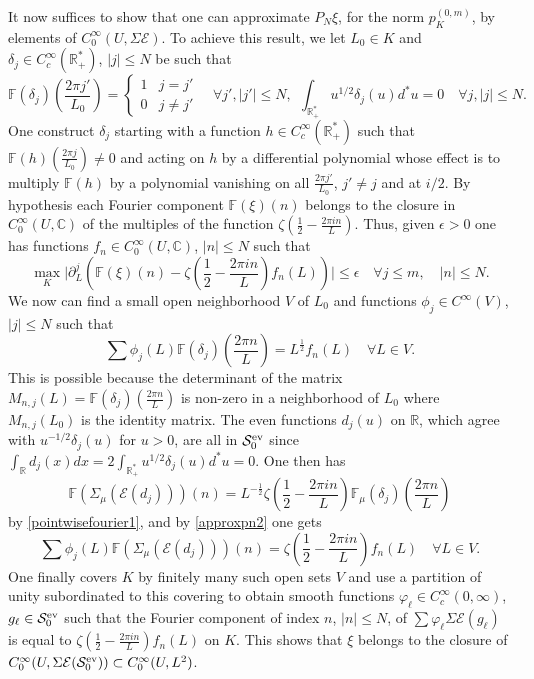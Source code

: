 \documentclass{pspum-l}
\theoremstyle{definition}
\theoremstyle{remark}
\numberwithin{equation}{section}
\def\C{{\mathbb C}}
\def\F{{\mathbb F}}
\def\R{{\mathbb R}}
\def\cE{{\mathcal E}}
\def\cS{{\mathcal S}}
\def\fourier{\F}
\def\sr0{{\cS^{\rm ev}_0}}
\begin{document}
 It now suffices to show that one can approximate $P_N\xi$, for the norm $p_K^{(0,m)}$, by elements of $C_0^{\infty}(U,\Sigma\cE)$. To achieve this result, we let $L_0\in K$ and $\delta_j\in C_c^{\infty}(\R_+^*)$, $\vert j \vert \leq N$  be such that 
 \[
 \fourier(\delta_j)\left(\frac{ 2 \pi j'}{L_0}\right)=\begin{cases}1 & j=j'\\
 0 & j\neq j'\end{cases}\quad \forall j', \vert j' \vert \leq N, \ \ \int_{\R_+^*}u^{1/2}\delta_j(u)d^*u=0\quad \forall j, \vert j \vert \leq N.
 \]
 One construct $\delta_j$  starting with a function $h\in C_c^{\infty}(\R_+^*)$ such that
 $\fourier(h)\left(\frac{ 2 \pi j}{L_0}\right)\neq 0$  and acting on $h$ by a differential polynomial whose effect is to multiply $\fourier(h)$ by a polynomial vanishing on all $\frac{ 2 \pi j'}{L_0}$, $j'\neq j$ and at $i/2$. By hypothesis each Fourier component $\fourier(\xi)(n)$ belongs to the closure in $C_0^{\infty}(U,\C)$ of the multiples of the function $\zeta\left(\frac 12-\frac{2\pi i n}{L}\right)$. Thus, given $\epsilon>0$ one has functions $f_n\in C_0^{\infty}(U,\C)$, $\vert n\vert \leq N$ such that \[
 \max_K \vert\partial_L^j\left(\fourier(\xi)(n)-\zeta\left(\frac 12-\frac{2\pi i n}{L}\right)f_n(L)\right)\vert \leq \epsilon\quad \forall j\leq m, \quad \vert n\vert \leq N.
 \]
 We now can find a small open neighborhood $V$ of $L_0$ and functions $\phi_j\in C^{\infty}(V)$, $\vert j\vert \leq N$ such that 
 \begin{equation}\label{approxpn2}
 \sum \phi_j(L)\fourier(\delta_j)\left(\frac{ 2 \pi n}{L}\right)=L^{\frac 12}f_n(L)\quad \forall L\in V.
 \end{equation}
 This is possible because the determinant of the matrix $M_{n,j}(L)=\fourier(\delta_j)\left(\frac{ 2 \pi n}{L}\right)$ is non-zero in a neighborhood of $L_0$ where $M_{n,j}(L_0)$ is the identity matrix. The even functions $d_j(u)$ on $\R$, which agree with $u^{-1/2}\delta_j(u)$ for $u>0$, are all in $\sr0$ since $\int_\R d_j(x)dx=2\int_{\R_+^*}u^{1/2}\delta_j(u)d^*u=0$. One then has \[
\fourier(\Sigma_\mu(\cE(d_j)))(n)=L^{-\frac 12}\zeta\left(\frac 12-\frac{2\pi i n}{L}\right)\fourier_\mu(\delta_j)\left(\frac{ 2 \pi n}{L}\right) 
\]
 by \eqref{pointwisefourier1}, and by \eqref{approxpn2} one  gets
 \[
 \sum \phi_j(L)\fourier(\Sigma_\mu(\cE(d_j)))(n)=\zeta\left(\frac 12-\frac{2\pi i n}{L}\right)f_n(L)\quad \forall L\in V.
\]
 One finally covers $K$ by finitely many such open sets $V$ and use a partition of unity subordinated to this covering to obtain smooth functions $\varphi_\ell\in C_c^{\infty}(0,\infty)$, $g_\ell \in \sr0$ such that the Fourier component of index $n$, $\vert n\vert \leq N$, of $\sum  \varphi_\ell \Sigma\cE(g_\ell)$ is  equal  to  $\zeta\left(\frac 12-\frac{2\pi i n}{L}\right)f_n(L)$ on $K$. This shows that $\xi$ belongs to the closure of  $C_0^{\infty}(U,\Sigma\cE(\sr0))\subset C_0^{\infty}(U,L^2)$. 
 \endproof 
 
\end{document}
